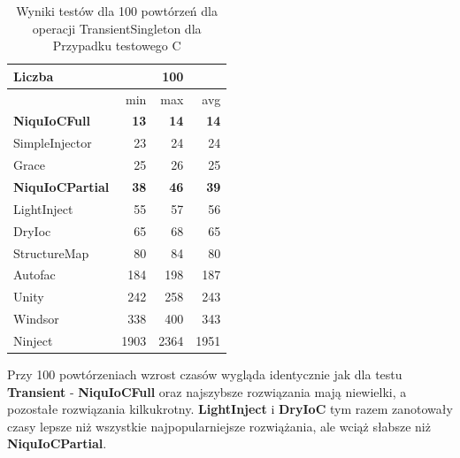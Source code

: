 \documentclass[12pt]{article}
\begin{document}
\begin{table}[H]
\captionsetup{belowskip=0pt,aboveskip=0pt}
\begin{center}
\begin{small}
	\begin{tabular}{ | l | r r r | }
    		\hline
Liczba & & 100 & \\ \hline
 & min & max & avg \\ \hline
\textbf{NiquIoCFull} & \textbf{13} & \textbf{14} & \textbf{14} \\ \hline
SimpleInjector & 23 & 24 & 24 \\ \hline
Grace & 25 & 26 & 25 \\ \hline
\textbf{NiquIoCPartial} & \textbf{38} & \textbf{46} & \textbf{39} \\ \hline
LightInject & 55 & 57 & 56 \\ \hline
DryIoc & 65 & 68 & 65 \\ \hline
StructureMap & 80 & 84 & 80 \\ \hline
Autofac & 184 & 198 & 187 \\ \hline
Unity & 242 & 258 & 243 \\ \hline
Windsor & 338 & 400 & 343 \\ \hline
Ninject & 1903 & 2364 & 1951 \\ \hline
  	\end{tabular}
\end{small}
\end{center}
\caption{Wyniki testów dla 100 powtórzeń dla operacji TransientSingleton dla Przypadku testowego C}
\label{TestCaseC_TransientSingleton100}
\end{table}
Przy 100 powtórzeniach wzrost czasów wygląda identycznie jak dla testu \textbf{Transient} - \textbf{NiquIoCFull} oraz najszybsze rozwiązania mają niewielki, a pozostałe rozwiązania kilkukrotny. \textbf{LightInject} i \textbf{DryIoC} tym razem zanotowały czasy lepsze niż wszystkie najpopularniejsze rozwiążania, ale wciąż słabsze niż \textbf{NiquIoCPartial}.
\\ \\
\end{document}
